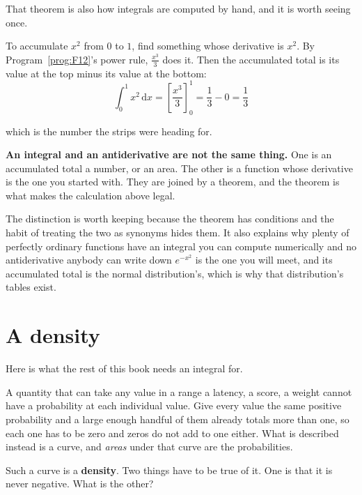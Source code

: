 \begin{fr}
That theorem is also how integrals are computed by hand, and it is worth
seeing once.

To accumulate $x^{2}$ from $0$ to $1$, find something whose derivative is
$x^{2}$. By Program~\ref{prog:F12}'s power rule, $\frac{x^{3}}{3}$ does it.
Then the accumulated total is its value at the top minus its value at the
bottom:
\[ \int_{0}^{1} x^{2}\,\mathrm{d}x
   = \left[\frac{x^{3}}{3}\right]_{0}^{1} = \frac{1}{3} - 0 = \frac{1}{3} \]

which is the number the strips were heading for.

\begin{trapbox}
\textbf{An integral and an antiderivative are not the same thing.} One is an
accumulated total \dash{} a number, or an area. The other is a function whose
derivative is the one you started with. They are joined by a theorem, and the
theorem is what makes the calculation above legal.

The distinction is worth keeping because the theorem has conditions and the
habit of treating the two as synonyms hides them. It also explains why plenty
of perfectly ordinary functions have an integral you can compute numerically
and no antiderivative anybody can write down \dash{} $e^{-x^{2}}$ is the one
you will meet, and its accumulated total is the normal distribution's, which
is why that distribution's tables exist.
\end{trapbox}
\end{fr}

\section{A density}
\label{sec:F13-density}

\begin{fr}
Here is what the rest of this book needs an integral for.

A quantity that can take any value in a range \dash{} a latency, a score, a
weight \dash{} cannot have a probability at each individual value. Give every
value the same positive probability and a large enough handful of them already
totals more than one, so each one has to be zero \dash{} and zeros do not add
to one either. What is described instead is a curve, and \emph{areas} under
that curve are the probabilities.

Such a curve is a \textbf{density}. Two things have to be true of it. One is
that it is never negative. What is the other?
\nextframe
\end{fr}


